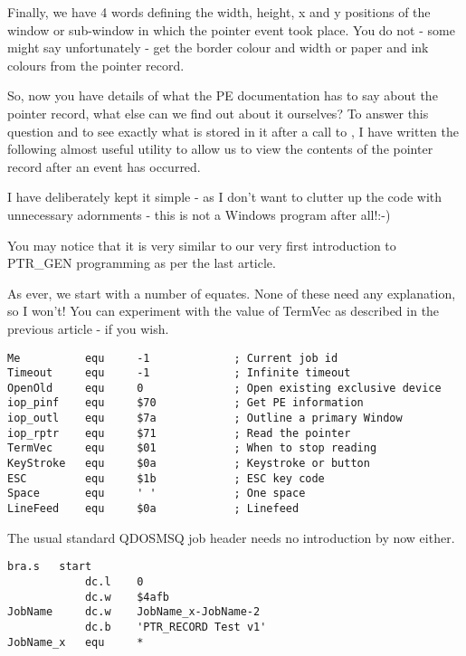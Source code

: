 Finally, we have 4 words defining the width, height, x and y positions of the window or
sub-{}window in which the pointer event took place. You do not -{} some might say 
unfortunately -{} get the border colour and width or paper and ink colours from the pointer
record.

So, now you have details of what the PE documentation has to say about the pointer record,
what else can we find out about it ourselves? To answer this question and to see exactly
what is stored in it after a call to , I have written the following almost useful
utility to allow us to view the contents of the pointer record after an event has
occurred.

I have deliberately kept it simple -{} as I don't want to clutter up the code with
unnecessary adornments -{} this is not a Windows program after all!:-{})

You may notice that it is very similar to our very first introduction to PTR\_GEN programming as per the last article.

As ever, we start with a number of equates. None of these need any explanation, so I
won't! You can experiment with the value of TermVec as described in the previous
article -{} if you wish.

\begin{lstlisting}[firstnumber=1,caption={Pointer Record Examiner - Equates}]
Me          equ     -1             ; Current job id
Timeout     equ     -1             ; Infinite timeout
OpenOld     equ     0              ; Open existing exclusive device
iop_pinf    equ     $70            ; Get PE information
iop_outl    equ     $7a            ; Outline a primary Window
iop_rptr    equ     $71            ; Read the pointer
TermVec     equ     $01            ; When to stop reading
KeyStroke   equ     $0a            ; Keystroke or button
ESC         equ     $1b            ; ESC key code
Space       equ     ' '            ; One space
LineFeed    equ     $0a            ; Linefeed
\end{lstlisting}

The usual standard QDOSMSQ job header needs no introduction by now either.

\begin{lstlisting}[firstnumber=last,caption={Pointer Record Examiner - Job Header}]
            bra.s   start
            dc.l    0
            dc.w    $4afb
JobName     dc.w    JobName_x-JobName-2
            dc.b    'PTR_RECORD Test v1'
JobName_x   equ     *
\end{lstlisting}

